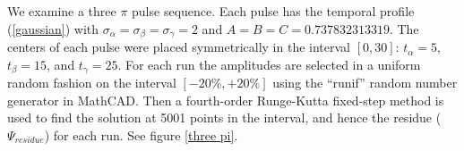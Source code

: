 We examine a three $\pi$ pulse sequence. Each pulse has the temporal profile (\ref{gaussian}) with $\sigma_\alpha=\sigma_\beta=\sigma_\gamma=2$ and $A=B=C=0.737832313319$. The centers of each pulse were placed symmetrically in the interval $[0,30]$: $t_\alpha=5$, $t_\beta=15$, and $t_\gamma=25$. For each run the amplitudes are selected in a uniform random fashion on the interval $[-20\%,+20\%]$ using the ``runif'' random number generator in MathCAD. Then a fourth-order Runge-Kutta fixed-step method is used to find the solution at 5001 points in the interval, and hence the residue ($\Psi_{residue}$) for each run. See figure \ref{three pi}.

